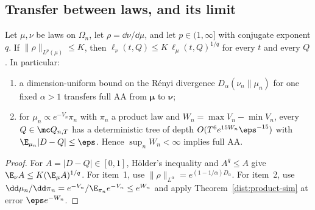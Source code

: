 \subsection{Transfer between laws, and its limit}\label{dist:transfer}
\begin{proposition}\label{dist:lp-transfer}
Let \(\mu,\nu\) be laws on \(\Omega_n\), let \(\rho=\dd\nu/\dd\mu\), and let
\(p\in(1,\infty]\) with conjugate exponent \(q\). If
\(\|\rho\|_{L^p(\mu)}\le K\), then
\(\ell_\nu(t,Q)\le K\,\ell_\mu(t,Q)^{1/q}\) for every \(t\) and every \(Q\). In
particular:
\begin{enumerate}
\item a dimension-uniform bound on the Rényi divergence \(D_\alpha(\nu_n\|\mu_n)\)
for one fixed \(\alpha>1\) transfers full AA from \(\boldsymbol\mu\) to
\(\boldsymbol\nu\);
\item for \(\mu_n\propto e^{-V_n}\pi_n\) with \(\pi_n\) a product law and
\(W_n=\max V_n-\min V_n\), every \(Q\in\mc Q_{n,T}\) has a deterministic tree of
depth \(O(T^6e^{15W_n}\eps^{-15})\) with \(\E_{\mu_n}|D-Q|\le\eps\). Hence
\(\sup_nW_n<\infty\) implies full AA.
\end{enumerate}
\end{proposition}
\begin{proof}
For \(A=|D-Q|\in[0,1]\), Hölder's inequality and \(A^q\le A\) give
\(\E_\nu A\le K(\E_\mu A)^{1/q}\). For item~1, use
\(\|\rho\|_{L^\alpha}=e^{(1-1/\alpha)D_\alpha}\). For item~2, use
\(\dd\mu_n/\dd\pi_n=e^{-V_n}/\E_{\pi_n}e^{-V_n}\le e^{W_n}\) and apply
Theorem~\ref{dist:product-sim} at error \(\eps e^{-W_n}\).
\end{proof}

